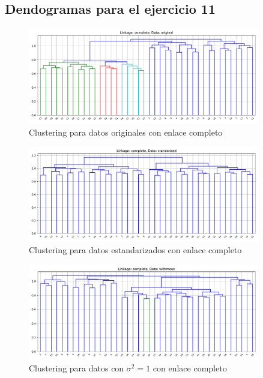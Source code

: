 \documentclass[11pt]{article}
\begin{document}
\subsection*{Dendogramas para el ejercicio 11}
\begin{figure}[H]
    \centering
    \includegraphics[width = 0.90\textwidth]{4-completeoriginal.pdf}
    \caption{Clustering para datos originales con enlace completo}
    \label{4-completeoriginal}
\end{figure}
\begin{figure}[H]
    \centering
    \includegraphics[width = 0.90\textwidth]{4-completestandarized.pdf}
    \caption{Clustering para datos estandarizados con enlace completo}
    \label{4-completestandarized}
\end{figure}
\begin{figure}[H]
    \centering
    \includegraphics[width = 0.90\textwidth]{4-completewithmean.pdf}
    \caption{Clustering para datos con $\sigma^2 = 1$ con enlace completo}
    \label{4-completewithmean}
\end{figure}
\end{document}
